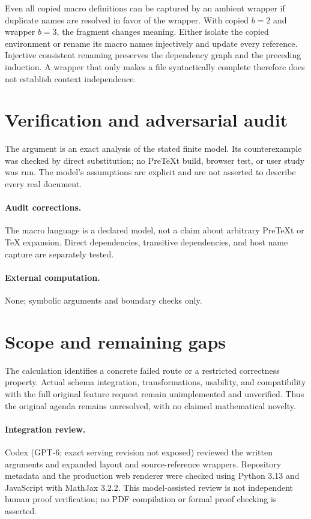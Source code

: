\documentclass[11pt]{article}
\begin{document}
Even all copied macro definitions can be captured by an ambient wrapper if duplicate names are resolved in favor of the wrapper. With copied $b=2$ and wrapper $b=3$, the fragment changes meaning. Either isolate the copied environment or rename its macro names injectively and update every reference. Injective consistent renaming preserves the dependency graph and the preceding induction. A wrapper that only makes a file syntactically complete therefore does not establish context independence.
\section{Verification and adversarial audit}
The argument is an exact analysis of the stated finite model. Its counterexample was checked by direct substitution; no PreTeXt build, browser test, or user study was run. The model's assumptions are explicit and are not asserted to describe every real document.
\paragraph{Audit corrections.} The macro language is a declared model, not a claim about arbitrary PreTeXt or TeX expansion. Direct dependencies, transitive dependencies, and host name capture are separately tested.
\paragraph{External computation.} None; symbolic arguments and boundary checks only.
\section{Scope and remaining gaps}
The calculation identifies a concrete failed route or a restricted correctness property. Actual schema integration, transformations, usability, and compatibility with the full original feature request remain unimplemented and unverified. Thus the original agenda remains unresolved, with no claimed mathematical novelty.
\paragraph{Integration review.} Codex (GPT-6; exact serving revision not exposed) reviewed the written arguments and expanded layout and source-reference wrappers. Repository metadata and the production web renderer were checked using Python 3.13 and JavaScript with MathJax 3.2.2. This model-assisted review is not independent human proof verification; no PDF compilation or formal proof checking is asserted.
\end{document}
